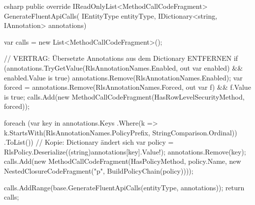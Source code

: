\begin{sourcecode}{csharp}
public override IReadOnlyList<MethodCallCodeFragment> GenerateFluentApiCalls(
    IEntityType entityType, IDictionary<string, IAnnotation> annotations)
{
    var calls = new List<MethodCallCodeFragment>();

    // VERTRAG: Übersetzte Annotations aus dem Dictionary ENTFERNEN
    if (annotations.TryGetValue(RlsAnnotationNames.Enabled, out var enabled)
        && enabled.Value is true)
    {
        annotations.Remove(RlsAnnotationNames.Enabled);
        var forced = annotations.Remove(RlsAnnotationNames.Forced, out var f)
                     && f.Value is true;
        calls.Add(new MethodCallCodeFragment(HasRowLevelSecurityMethod, forced));
    }

    foreach (var key in annotations.Keys
                 .Where(k => k.StartsWith(RlsAnnotationNames.PolicyPrefix,
                                          StringComparison.Ordinal))
                 .ToList())                         // Kopie: Dictionary ändert sich
    {
        var policy = RlsPolicy.Deserialize((string)annotations[key].Value!);
        annotations.Remove(key);
        calls.Add(new MethodCallCodeFragment(HasPolicyMethod, policy.Name,
            new NestedClosureCodeFragment("p", BuildPolicyChain(policy))));
    }

    calls.AddRange(base.GenerateFluentApiCalls(entityType, annotations));
    return calls;
}
\end{sourcecode}


